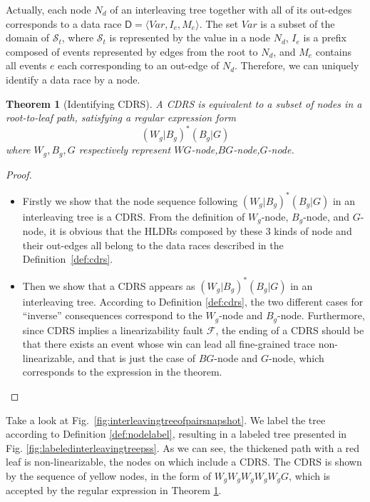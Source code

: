 \documentclass[runningheads]{llncs}
\newcommand{\pair}[1]{{\langle{#1}\rangle}}
\newcommand{\se}{\mathit{I_e}}
\newcommand{\ce}{\mathit{M_e}}
\newtheorem{myTheo}{Theorem}
\begin{document}
Actually, each node $N_d$ of an interleaving tree together with all of its out-edges corresponds to a data race $\mathsf{D} = \pair{\mathit{Var}, \se,\ce}$. The set $\mathit{Var}$ is a subset of the domain of $\mathcal{S}_t$, where $\mathcal{S}_t$ is represented by the value in a node $N_d$, $\se$ is a prefix composed of events represented by edges from the root to $N_d$, and $\ce$ contains all events $e$ each corresponding to an out-edge of $N_d$. Therefore, we can uniquely identify a data race by a node.

\begin{myTheo}[Identifying CDRS]\label{theo:idenfycdrs}
    A CDRS is equivalent to a subset of nodes in a root-to-leaf path, satisfying a regular expression form
    $$(W_g|B_g)^*(B_g|G)$$
    where $W_g,B_g,G$ respectively represent $\mathit{WG}$-node,$\mathit{BG}$-node,$\mathit{G}$-node.
\end{myTheo}





\begin{proof}



\begin{itemize}
\item Firstly we show that the node sequence following $(W_g|B_g)^*(B_g|G)$ in an interleaving tree is a CDRS.
From the definition of $W_g$-node, $B_g$-node, and $G$-node, it is obvious that the HLDRs composed by these 3 kinds of node and their out-edges all belong to the
data races described in the Definition~\ref{def:cdrs}.

\item Then we show that a CDRS appears as $(W_g|B_g)^*(B_g|G)$ in an interleaving tree.
According to Definition \ref{def:cdrs}, the two different cases for ``inverse'' consequences correspond to 
the $W_g$-node and $B_g$-node. Furthermore, since CDRS implies a linearizability fault $\mathcal{F}$, the ending of a CDRS 
should be that there exists an event whose win can lead all fine-grained trace non-linearizable, and that is just the case of $BG$-node 
and $G$-node, which corresponds to the expression in the theorem.
\end{itemize}
 
 \end{proof}








\begin{example}
Take a look at Fig.~\ref{fig:interleavingtreeofpairsnapshot}.  We label the tree according to Definition \ref{def:nodelabel}, resulting in a labeled tree presented in Fig. \ref{fig:labeledinterleavingtreepss}.  As we can see, the thickened path with a red leaf is non-linearizable, the nodes on which include a CDRS. The CDRS is shown by the sequence of yellow nodes, in the form of $\mathit{W_gW_gW_gW_gW_gG}$, which is accepted by the regular expression in Theorem \ref{theo:idenfycdrs}.

\end{example}
\end{document}
